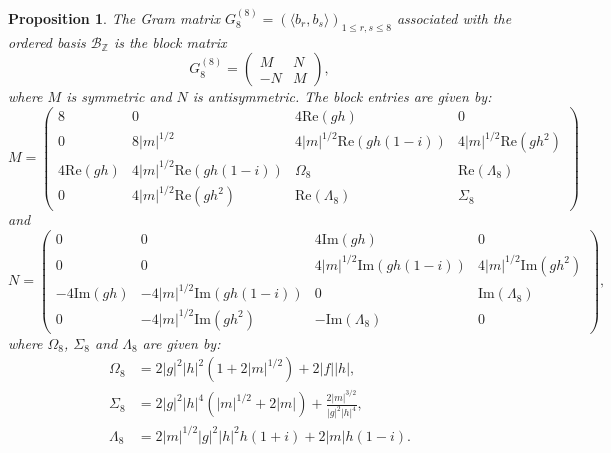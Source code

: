 \documentclass{amsart}
\theoremstyle{plain}
\newtheorem{proposition}[theorem]{Proposition}
\theoremstyle{definition}
\theoremstyle{remark}
\numberwithin{equation}{section}
\begin{document}
\begin{proposition}
The Gram matrix $G_{8}^{(8)} = (\langle b_r, b_s \rangle)_{1\le r,s \le 8}$ associated with the ordered basis $\mathcal{B}_{\mathbb{Z}}$ is the block matrix
\[
G_{8}^{(8)} = \begin{pmatrix} M & N \\ -N & M \end{pmatrix},
\]
where $M$ is symmetric and $N$ is antisymmetric. The block entries are given by:
\[
M = \begin{pmatrix}
8 & 0 & 4\text{Re}(gh) & 0 \\
0 & 8|m|^{1/2} & 4|m|^{1/2}\text{Re}(gh(1-i)) & 4|m|^{1/2}\text{Re}(gh^2) \\
4\text{Re}(gh) & 4|m|^{1/2}\text{Re}(gh(1-i)) & \Omega_8 & \text{Re}(\Lambda_8) \\
0 & 4|m|^{1/2}\text{Re}(gh^2) & \text{Re}(\Lambda_8) & \Sigma_8
\end{pmatrix}
\]
and
\[
N = \begin{pmatrix}
0 & 0 & 4\text{Im}(gh) & 0 \\
0 & 0 & 4|m|^{1/2}\text{Im}(gh(1-i)) & 4|m|^{1/2}\text{Im}(gh^2) \\
-4\text{Im}(gh) & -4|m|^{1/2}\text{Im}(gh(1-i)) & 0 & \text{Im}(\Lambda_8) \\
0 & -4|m|^{1/2}\text{Im}(gh^2) & -\text{Im}(\Lambda_8) & 0
\end{pmatrix},
\]
where $\Omega_{8}$, $\Sigma_{8}$ and $\Lambda_{8}$ are given by:
\begin{align*}
\Omega_8 &= 2|g|^2|h|^2 (1 + 2|m|^{1/2}) + 2|f||h|, \\
\Sigma_8 &= 2|g|^2|h|^4 (|m|^{1/2} + 2|m|) + \frac{2|m|^{3/2}}{|g|^2|h|^4}, \\
\Lambda_8 &= 2|m|^{1/2}|g|^2|h|^2 h(1+i) + 2|m| h(1-i).
\end{align*}
\end{proposition}
\end{document}
